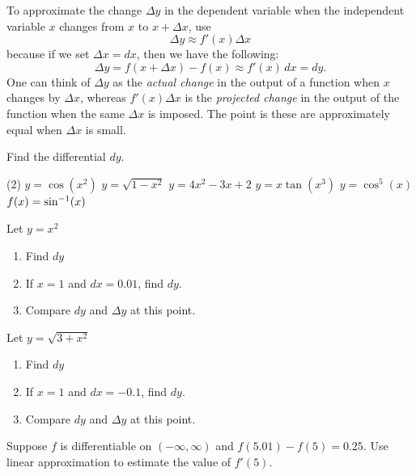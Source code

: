 \documentclass[../mathNotesPreamble]{subfiles}
\begin{document}
\begin{thmBox*}
  To approximate the change $\Delta y$ in the dependent variable when the independent variable $x$ changes from $x$ to $x+\Delta x$, use
      $$\Delta y\approx f'(x)\Delta x$$
  because if we set $\Delta x = dx$, then we have the following:
      $$\Delta y= f(x+\Delta x)-f(x)\approx f'(x)\,dx=dy.$$
  One can think of $\Delta y$ as the \textit{actual change} in the output of a function when $x$ changes by $\Delta x$, whereas $f'(x)\Delta x$ is the \textit{projected change} in the output of the function when the same $\Delta x$ is imposed. The point is these are approximately equal when $\Delta x$ is small.
\end{thmBox*}
\pagebreak

\begin{ex*}
  Find the differential $dy$.
\end{ex*}
\begin{tasks}[after-item-skip=\stretch{1}, label=~](2)
  \task $y=\cos(x^2)$
  \task $y=\sqrt{1-x^2}$
  \task $y=4x^2-3x+2$
  \task $y=x\tan(x^3)$
  \task $y=\cos^5(x)$
  \task $f(x)=\sin^{-1}(x)$
\end{tasks}
\pagebreak
\begin{ex*}
  Let $y=x^2$
\end{ex*}
\begin{enumerate}[label=\alph*), itemsep=\stretch{1}]
  \item Find $dy$
  \item If $x=1$ and $dx=0.01$, find $dy$.
  \item Compare $dy$ and $\Delta y$ at this point.
\end{enumerate}

\begin{ex*}
  Let $y=\sqrt{3+x^2}$
\end{ex*}
\begin{enumerate}[label=\alph*), itemsep=\stretch{1}]
  \item Find $dy$
  \item If $x=1$ and $dx=-0.1$, find $dy$.
  \item Compare $dy$ and $\Delta y$ at this point.
\end{enumerate}

\pagebreak
\begin{ex*}
  Suppose $f$ is differentiable on $(-\infty,\infty)$ and $f(5.01)-f(5)=0.25$. Use linear approximation to estimate the value of $f'(5)$.
\end{ex*}
\end{document}
